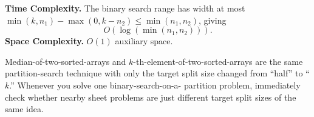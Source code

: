 \begin{complexitybox}
\textbf{Time Complexity.} The binary search range has width at most
$\min(k, n_1) - \max(0, k-n_2) \le \min(n_1, n_2)$, giving
\[
  O(\log(\min(n_1, n_2))).
\]
\textbf{Space Complexity.} $O(1)$ auxiliary space.
\end{complexitybox}

\begin{takeawaybox}
Median-of-two-sorted-arrays and $k$-th-element-of-two-sorted-arrays are the
same partition-search technique with only the target split size changed
from ``half'' to ``$k$.'' Whenever you solve one binary-search-on-a-
partition problem, immediately check whether nearby sheet problems are
just different target split sizes of the same idea.
\end{takeawaybox}

